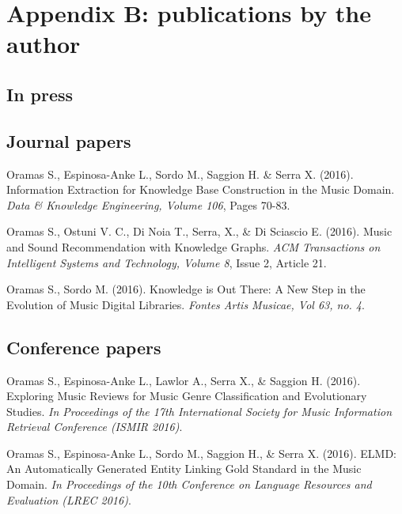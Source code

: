 
\chapter{Appendix B: publications by the author}
\label{sec:Pubs}


\section*{In press}


\section*{Journal papers}


Oramas S., Espinosa-Anke L., Sordo M., Saggion H. \& Serra X. (2016). Information Extraction for Knowledge Base Construction in the Music Domain. \emph{Data \& Knowledge Engineering, Volume 106}, Pages 70-83.

\vspace{0.2cm}

Oramas S., Ostuni V. C., Di Noia T., Serra, X., \& Di Sciascio E. (2016). Music and Sound Recommendation with Knowledge Graphs. \emph{ACM Transactions on Intelligent Systems and Technology, Volume 8}, Issue 2, Article 21.

\vspace{0.2cm}

Oramas S., Sordo M. (2016). Knowledge is Out There: A New Step in the Evolution of Music Digital Libraries. \emph{Fontes Artis Musicae, Vol 63, no. 4}.


\section*{Conference papers}

Oramas S., Espinosa-Anke L., Lawlor A., Serra X., \& Saggion H. (2016). Exploring Music Reviews for Music Genre Classification and Evolutionary Studies. \emph{In Proceedings of the 17th International Society for Music Information Retrieval Conference (ISMIR 2016)}.

\vspace{0.2cm}

Oramas S., Espinosa-Anke L., Sordo M., Saggion H., \& Serra X. (2016). ELMD: An Automatically Generated Entity Linking Gold Standard in the Music Domain. \emph{In Proceedings of the 10th Conference on Language Resources and Evaluation (LREC 2016)}.

